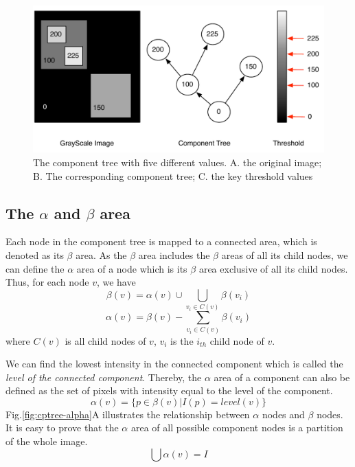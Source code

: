 \begin{figure}[htbp]
\centering
\includegraphics[width=1.0\textwidth]{images/cptree_example}
\caption[An example of component tree with four levels and five components]{The component tree with five different values. A. the original image; B. The corresponding component tree; C. the key threshold values}
\label{fig:cptree-example}
\end{figure}
\subsection{The $\alpha$ and $\beta$ area} \label{sec:alpha-beta-area}
Each node in the component tree is mapped to a connected area, which is denoted as its $\beta$ area. As the $\beta$ area includes the $\beta$ areas of all its child nodes, we can define the $\alpha$ area of a node which is its $\beta$ area exclusive of all its child nodes. Thus, for each node $v$, we have
$$
\beta(v) = \alpha(v)\cup\bigcup_{v_i \in C(v)} \beta(v_i)   
$$
$$
\alpha(v) = \beta(v) - \sum_{v_i\in C(v)}\beta(v_i)
$$
where $C(v)$ is all child nodes of $v$, $v_i$ is the $i_{th}$ child node of $v$. 

We can find the lowest intensity in the connected component which is called the \emph{level of the connected component}. Thereby, the $\alpha$ area of a component can also be defined as the set of pixels with intensity equal to the level of the component.
$$
\alpha(v) = \{p \in \beta(v)| I(p) = level(v)\}
$$
Fig.\ref{fig:cptree-alpha}A illustrates the relationship between $\alpha$ nodes and $\beta$ nodes. It is easy to prove that the $\alpha$ area of all possible component nodes is a partition of the whole image. 
$$
\bigcup \alpha(v) = I
$$

